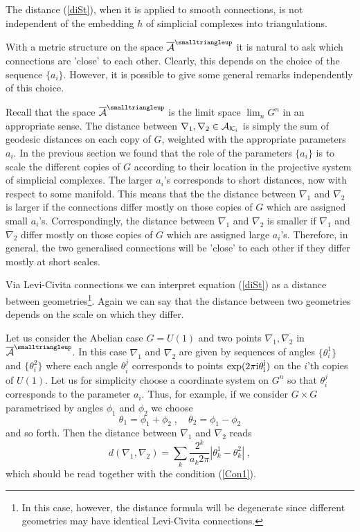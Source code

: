 \documentclass[12pt]{article}
\def\p{\pi}
\def\ca{{\cal A}}
\def\ck{{\cal K}}
\begin{document}
The distance (\ref{diSt}), when it is applied to smooth connections, is not independent of the embedding $h$ of simplicial complexes into triangulations. 




With a metric structure on the space $\overline{\ca}^{\smalltriangleup}$ it is natural to ask which connections are 'close' to each other. Clearly, this depends on the choice of the sequence $\{a_i\}$. However, it is possible to give some general remarks independently of this choice.

Recall that the space $\overline{\ca}^{\smalltriangleup}$ is the limit space $\lim_n G^n$ in an appropriate sense. The distance between $\nabla_1,\nabla_2\in\ca_{\ck_i}$ is simply the sum of geodesic distances on each copy of $G$, weighted with the appropriate parameters $a_i$. In the previous section we found that the role of the parameters $\{a_i\}$ is to scale the different copies of $G$ according to their location in the projective system of simplicial complexes. The larger $a_i$'s corresponds to short distances, now with respect to some manifold.
This means that the the distance between $\nabla_1$ and $\nabla_2$ is larger if the connections differ mostly on those copies of $G$ which are assigned small $a_i$'s. Correspondingly, the distance between $\nabla_1$ and $\nabla_2$ is smaller if $\nabla_1$ and $\nabla_2$ differ mostly on those copies of $G$ which are assigned large $a_i$'s. Therefore, in general, the two generalised connections will be 'close' to each other if they differ mostly at short scales. 

Via Levi-Civita connections we can interpret equation (\ref{diSt}) as a distance between geometries\footnote{In this case, however, the distance formula will be degenerate since different geometries may have identical Levi-Civita connections.}. Again we can say that the distance between two geometries depends on the scale on which they differ.









Let us consider the Abelian case $G=U(1)$ and two points $\nabla_1,\nabla_2$ in $\overline{\ca}^{\smalltriangleup}$. In this case $\nabla_1$ and $\nabla_2$ are given by sequences of angles $\{\theta^1_i\}$ and $\{\theta^2_i\}$ where each angle $\theta^j_i$ corresponds to points $\exp(2\pi\rm{i}\theta^j_i)$ on the $i$'th copies of $U(1)$. Let us for simplicity choose a coordinate system on $G^n$ so that $\theta^j_i$ corresponds to the parameter $a_i$. Thus, for example, if we consider $G\times G$ parametrised by angles $\phi_1$ and $\phi_2$ we choose
\[
\theta_1 = \phi_1 + \phi_2 \;,\quad \theta_2 = \phi_1 - \phi_2
\]
and so forth. Then the distance between $\nabla_1$ and $\nabla_2$ reads
\[
d(\nabla_1,\nabla_2)= \sum_k \frac{2^k}{a_k 2\p}|\theta_k^1-\theta_k^2 |\;,
\]
which should be read together with the condition (\ref{Con1}).
\end{document}
